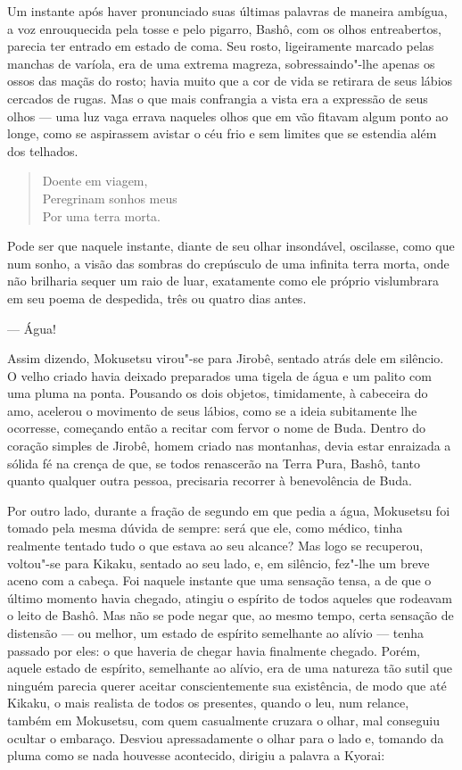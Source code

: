 Um instante após haver pronunciado suas últimas palavras de maneira
ambígua, a voz enrouquecida pela tosse e pelo pigarro, Bashô, com os
olhos entreabertos, parecia ter entrado em estado de coma. Seu rosto,
ligeiramente marcado pelas manchas de varíola, era de uma extrema
magreza, sobressaindo"-lhe apenas os ossos das maçãs do rosto; havia
muito que a cor de vida se retirara de seus lábios cercados de rugas.
Mas o que mais confrangia a vista era a expressão de seus olhos --- uma
luz vaga errava naqueles olhos que em vão fitavam algum ponto ao longe,
como se aspirassem avistar o céu frio e sem limites que se estendia
além dos telhados.

\begin{verse}
Doente em viagem,\\
Peregrinam sonhos meus\\
Por uma terra morta.
\end{verse}

Pode ser que naquele instante, diante de seu olhar insondável,
oscilasse, como que num sonho, a visão das sombras do crepúsculo de uma
infinita terra morta, onde não brilharia sequer um raio de luar,
exatamente como ele próprio vislumbrara em seu poema de despedida, três
ou quatro dias antes.

--- Água!

Assim dizendo, Mokusetsu virou"-se para Jirobê, sentado atrás dele em
silêncio. O velho criado havia deixado preparados uma tigela de água e
um palito com uma pluma na ponta. Pousando os dois objetos,
timidamente, à cabeceira do amo, acelerou o movimento de seus lábios,
como se a ideia subitamente lhe ocorresse, começando então a recitar
com fervor o nome de Buda. Dentro do coração simples de Jirobê, homem
criado nas montanhas, devia estar enraizada a sólida fé na crença de
que, se todos renascerão na Terra Pura, Bashô, tanto quanto qualquer
outra pessoa, precisaria recorrer à benevolência de Buda.

Por outro lado, durante a fração de segundo em que pedia a água,
Mokusetsu foi tomado pela mesma dúvida de sempre: será que ele, como
médico, tinha realmente tentado tudo o que estava ao seu alcance? Mas
logo se recuperou, voltou"-se para Kikaku, sentado ao seu lado, e, em
silêncio, fez"-lhe um breve aceno com a cabeça. Foi naquele instante que
uma sensação tensa, a de que o último momento havia chegado, atingiu o
espírito de todos aqueles que rodeavam o leito de Bashô. Mas não se
pode negar que, ao mesmo tempo, certa sensação de distensão --- ou
melhor, um estado de espírito semelhante ao alívio --- tenha passado por
eles: o que haveria de chegar havia finalmente chegado. Porém, aquele
estado de espírito, semelhante ao alívio, era de uma natureza tão sutil
que ninguém parecia querer aceitar conscientemente sua existência, de
modo que até Kikaku, o mais realista de todos os presentes, quando o
leu, num relance, também em Mokusetsu, com quem casualmente cruzara o
olhar, mal conseguiu ocultar o embaraço. Desviou apressadamente o olhar
para o lado e, tomando da pluma como se nada houvesse acontecido,
dirigiu a palavra a Kyorai:

